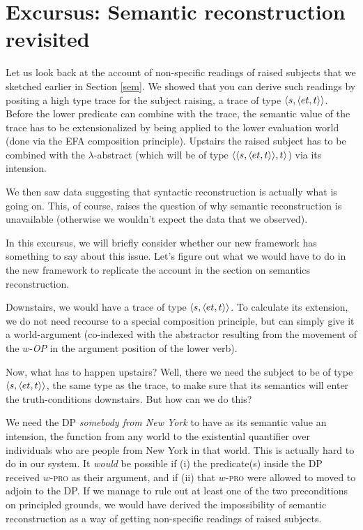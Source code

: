 \section{Excursus: Semantic reconstruction revisited}

Let us look back at the account of non-specific readings of raised subjects that
we sketched earlier in Section \ref{sem}. We showed that you can derive such
readings by positing a high type trace for the subject raising, a trace of type
$\langle s,\langle et,t \rangle \rangle$. Before the lower predicate can combine with the
trace, the semantic value of the trace has to be extensionalized by being
applied to the lower evaluation world (done via the EFA composition principle).
Upstairs the raised subject has to be combined with the $\lambda$-abstract
(which will be of type $\langle \langle s,\langle et,t \rangle \rangle,t \rangle$) via its intension.

We then saw data suggesting that syntactic reconstruction is actually what is
going on. This, of course, raises the question of why semantic reconstruction is
unavailable (otherwise we wouldn't expect the data that we observed).

In this excursus, we will briefly consider whether our new framework has
something to say about this issue. Let's figure out what we would have to do in
the new framework to replicate the account in the section on semantics
reconstruction.

Downstairs, we would have a trace of type $\langle s,\langle et,t \rangle \rangle$. To
calculate its extension, we do not need recourse to a special composition
principle, but can simply give it a world-argument (co-indexed with the
abstractor resulting from the movement of the $w$-\emph{OP} in the argument
position of the lower verb).

Now, what has to happen upstairs? Well, there we need the subject to be of type
$\langle s,\langle et,t \rangle \rangle$, the same type as the trace, to make sure that its
semantics will enter the truth-conditions downstairs. But how can we do this?

We need the DP \emph{somebody from New York} to have as its semantic value an
intension, the function from any world to the existential quantifier over
individuals who are people from New York in that world. This is actually hard to
do in our system. It \emph{would} be possible if (i) the predicate(s) inside the
DP received $w$-\textsc{pro} as their argument, and if (ii) that
$w$-\textsc{pro} were allowed to moved to adjoin to the DP. If we manage to rule
out at least one of the two preconditions on principled grounds, we would have
derived the impossibility of semantic reconstruction as a way of getting
non-specific readings of raised subjects.

